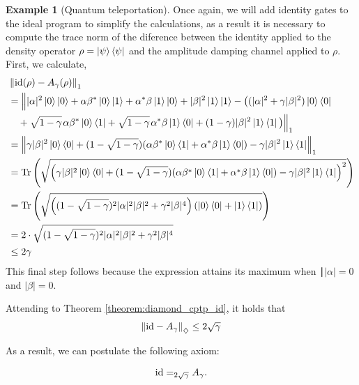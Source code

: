 \documentclass[10pt,a4paper]{amsart}
\theoremstyle{definition}
\theoremstyle{definition}
\newtheorem{example}[definition]{Example}
\theoremstyle{definition}
\theoremstyle{definition}
\theoremstyle{definition}
\theoremstyle{definition}
\begin{document}
\begin{example}[Quantum teleportation]
Once again, we will add identity gates to the ideal program to simplify the calculations, as a result it is necessary to compute the trace norm of the diference between the identity applied to the density operator $\rho = \ket{\psi} \bra{\psi}$ and the amplitude damping channel applied to $\rho$.
First, we calculate, 
\begin{align*}
  & \left\lVert  \mathrm{id}(\rho) - A_{\gamma}(\rho) \right\rVert_{1} \\
  & =    \Big\lVert  |\alpha|^{2} \ket{0} \ket{0} + \alpha \beta^{*} \ket{0} \ket{1} + \alpha^{*} \beta \ket{1} \ket{0} + |\beta|^{2} \ket{1} \ket{1}  - \big((|\alpha|^{2} + \gamma |\beta|^{2}) \ket{0}\bra{0} \\ 
  & \hspace{10pt}  +  \sqrt{1-\gamma} \hspace{1pt} \alpha \beta^{*} \ket{0}\bra{1} + \sqrt{1-\gamma} \hspace{1pt} \alpha^{*} \beta \ket{1}\bra{0} + (1-\gamma) |\beta|^{2} \ket{1}\bra{1}\big) \Big\rVert_1 \\
   & = \left\lVert \gamma |\beta|^{2} \ket{0} \bra{0} + (1-\sqrt{1-\gamma}) (\alpha \beta^{*} \ket{0} \bra{1} + \alpha^{*} \beta \ket{1} \bra{0}) - \gamma |\beta|^{2} \ket{1} \bra{1} \right\rVert_{1} \\
   & = \text{Tr} \left( \sqrt{\left( \gamma |\beta|^{2} \ket{0} \bra{0} + (1-\sqrt{1-\gamma}) (\alpha \beta^{*} \ket{0} \bra{1} + \alpha^{*} \beta \ket{1} \bra{0}) - \gamma |\beta|^{2} \ket{1} \bra{1}  \right)^2}\right) \\
   & = \text{Tr} \left( \sqrt{\left( (1-\sqrt{1-\gamma})^{2} |\alpha|^{2}|\beta|^{2} + \gamma^{2} |\beta|^{4} \right) (\ket{0} \bra{0} + \ket{1} \bra{1} ) } \right) \\
   & = 2 \cdot \sqrt{  (1-\sqrt{1-\gamma})^{2} |\alpha|^{2}|\beta|^{2} + \gamma^{2} |\beta|^{4}} \\
   & \leq 2 \gamma
\end{align*}
This final step follows because the expression attains its maximum when 
∣$|\alpha|=0 $ and $|\beta|=0.$

Attending to Theorem \ref{theorem:diamond_cptp_id}, it holds that
\begin{align*}
  \left\lVert  \mathrm{id} - A_\gamma \right\rVert_{\diamondsuit} \leq 2 \sqrt{\gamma}
\end{align*}

As a result, we can postulate the following axiom:

    \begin{align} \label{eq:amp_damp_teleport}
        \mathrm{id} =_{2 \sqrt{\gamma}} A_\gamma.
    \end{align}



\end{example}
\end{document}

